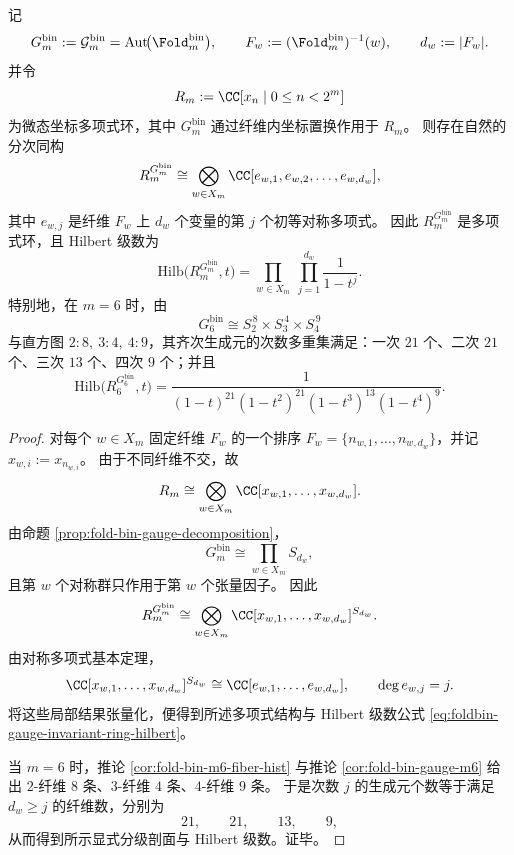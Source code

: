 \begin{theorem}\label{thm:foldbin-gauge-invariant-ring}
记
\[
G_m^{\mathrm{bin}}:=\mathcal G_m^{\mathrm{bin}}
=\mathrm{Aut}\!\bigl(\Fold_m^{\mathrm{bin}}\bigr),
\qquad
F_w:=(\Fold_m^{\mathrm{bin}})^{-1}(w),
\qquad
d_w:=|F_w|.
\]
并令
\[
R_m:=\CC[x_n\mid 0\le n<2^m]
\]
为微态坐标多项式环，其中 \(G_m^{\mathrm{bin}}\) 通过纤维内坐标置换作用于 \(R_m\)。
则存在自然的分次同构
\[
R_m^{G_m^{\mathrm{bin}}}
\cong
\bigotimes_{w\in X_m}\CC[e_{w,1},e_{w,2},\dots,e_{w,d_w}],
\]
其中 \(e_{w,j}\) 是纤维 \(F_w\) 上 \(d_w\) 个变量的第 \(j\) 个初等对称多项式。
因此 \(R_m^{G_m^{\mathrm{bin}}}\) 是多项式环，且 Hilbert 级数为
\begin{equation}\label{eq:foldbin-gauge-invariant-ring-hilbert}
\mathrm{Hilb}\bigl(R_m^{G_m^{\mathrm{bin}}},t\bigr)
=
\prod_{w\in X_m}\ \prod_{j=1}^{d_w}\frac{1}{1-t^j}.
\end{equation}
特别地，在 \(m=6\) 时，由
\[
G_6^{\mathrm{bin}}\cong S_2^{\,8}\times S_3^{\,4}\times S_4^{\,9}
\]
与直方图 \(2:8,\ 3:4,\ 4:9\)，其齐次生成元的次数多重集满足：一次 \(21\) 个、二次 \(21\) 个、三次 \(13\) 个、四次 \(9\) 个；并且
\[
\mathrm{Hilb}\bigl(R_6^{G_6^{\mathrm{bin}}},t\bigr)
=
\frac{1}{(1-t)^{21}(1-t^2)^{21}(1-t^3)^{13}(1-t^4)^9}.
\]
\end{theorem}
\begin{proof}
对每个 \(w\in X_m\) 固定纤维 \(F_w\) 的一个排序 \(F_w=\{n_{w,1},\dots,n_{w,d_w}\}\)，并记 \(x_{w,i}:=x_{n_{w,i}}\)。
由于不同纤维不交，故
\[
R_m\cong \bigotimes_{w\in X_m}\CC[x_{w,1},\dots,x_{w,d_w}].
\]
由命题 \ref{prop:fold-bin-gauge-decomposition}，
\[
G_m^{\mathrm{bin}}\cong \prod_{w\in X_m}S_{d_w},
\]
且第 \(w\) 个对称群只作用于第 \(w\) 个张量因子。
因此
\[
R_m^{G_m^{\mathrm{bin}}}
\cong
\bigotimes_{w\in X_m}\CC[x_{w,1},\dots,x_{w,d_w}]^{S_{d_w}}.
\]
由对称多项式基本定理，
\[
\CC[x_{w,1},\dots,x_{w,d_w}]^{S_{d_w}}
\cong
\CC[e_{w,1},\dots,e_{w,d_w}],
\qquad \deg e_{w,j}=j.
\]
将这些局部结果张量化，便得到所述多项式结构与 Hilbert 级数公式 \eqref{eq:foldbin-gauge-invariant-ring-hilbert}。

当 \(m=6\) 时，推论 \ref{cor:fold-bin-m6-fiber-hist} 与推论 \ref{cor:fold-bin-gauge-m6} 给出 \(2\)-纤维 \(8\) 条、\(3\)-纤维 \(4\) 条、\(4\)-纤维 \(9\) 条。
于是次数 \(j\) 的生成元个数等于满足 \(d_w\ge j\) 的纤维数，分别为
\[
21,\qquad 21,\qquad 13,\qquad 9,
\]
从而得到所示显式分级剖面与 Hilbert 级数。证毕。
\end{proof}

